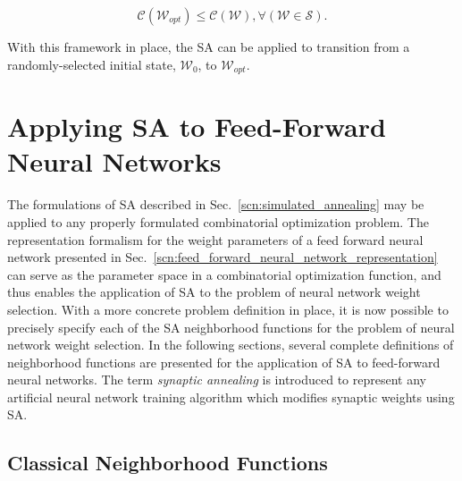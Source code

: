 \documentclass[11pt]{afthesis}
\begin{document}
	 \begin{equation*} \label{eq:optimal_definition}
	 \mathcal{C}(\boldsymbol{\mathcal{W}}_{opt}) \leq \mathcal{C}\left( \boldsymbol{\mathcal{W}}\right) , \forall\left(  \boldsymbol{\mathcal{W}} \in \boldsymbol{\mathcal{S}}\right) .
	 \end{equation*}
	 
	 \noindent With this framework in place, the SA can be applied to transition from a randomly-selected initial state, $\boldsymbol{\mathcal{W}}_0$, to $\boldsymbol{\mathcal{W}}_{opt}$.
	 

	\section{Applying SA to Feed-Forward Neural Networks}
	
	The formulations of SA described in Sec.~\ref{scn:simulated_annealing} may be applied to any properly formulated combinatorial optimization problem. The representation formalism for the weight parameters of a feed forward neural network presented in Sec.~\ref{scn:feed_forward_neural_network_representation} can serve as the parameter space in a combinatorial optimization function, and thus enables the application of SA to the problem of neural network weight selection. With a more concrete problem definition in place, it is now possible to precisely specify each of the SA neighborhood functions for the problem of neural network weight selection. In the following sections, several complete definitions of neighborhood functions are presented for the application of SA to feed-forward neural networks. The term \textit{synaptic annealing} is introduced to represent any artificial neural network training algorithm which modifies synaptic weights using SA.
	
	
	\subsection{Classical Neighborhood Functions}
	\label{scn:classical_neighborhood}
	
\end{document}
